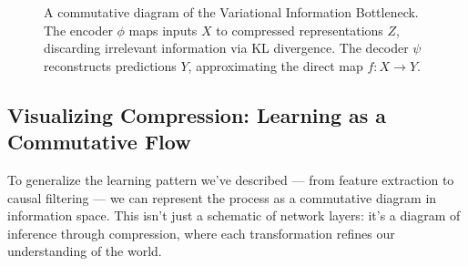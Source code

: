 \begin{figure}[H]
\centering
{}
\caption{A commutative diagram of the Variational Information Bottleneck. The encoder \( \phi \) maps inputs \( X \) to compressed representations \( Z \), discarding irrelevant information via KL divergence. The decoder \( \psi \) reconstructs predictions \( Y \), approximating the direct map \( f: X \rightarrow Y \).}
\end{figure}










\subsection{Visualizing Compression: Learning as a Commutative Flow}

To generalize the learning pattern we’ve described — from feature extraction to causal filtering — we can represent the process as a commutative diagram in information space. This isn’t just a schematic of network layers: it’s a diagram of inference through compression, where each transformation refines our understanding of the world.










